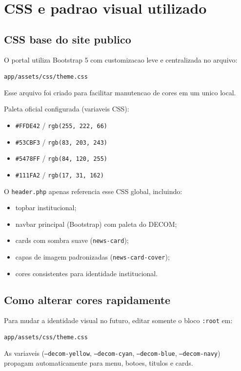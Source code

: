 \documentclass[12pt,a4paper]{article}
\begin{document}
\section{CSS e padrao visual utilizado}
\subsection{CSS base do site publico}
O portal utiliza Bootstrap 5 com customizacao leve e centralizada no arquivo:
\begin{center}
\texttt{app/assets/css/theme.css}
\end{center}
Esse arquivo foi criado para facilitar manutencao de cores em um unico local.

Paleta oficial configurada (variaveis CSS):
\begin{itemize}
    \item \texttt{\#FFDE42} / \texttt{rgb(255, 222, 66)}
    \item \texttt{\#53CBF3} / \texttt{rgb(83, 203, 243)}
    \item \texttt{\#5478FF} / \texttt{rgb(84, 120, 255)}
    \item \texttt{\#111FA2} / \texttt{rgb(17, 31, 162)}
\end{itemize}

O \texttt{header.php} apenas referencia esse CSS global, incluindo:
\begin{itemize}
    \item topbar institucional;
    \item navbar principal (Bootstrap) com paleta do DECOM;
    \item cards com sombra suave (\texttt{news-card});
    \item capas de imagem padronizadas (\texttt{news-card-cover});
    \item cores consistentes para identidade institucional.
\end{itemize}

\subsection{Como alterar cores rapidamente}
Para mudar a identidade visual no futuro, editar somente o bloco \texttt{:root} em:
\begin{center}
\texttt{app/assets/css/theme.css}
\end{center}
As variaveis (\texttt{--decom-yellow}, \texttt{--decom-cyan}, \texttt{--decom-blue}, \texttt{--decom-navy}) propagam automaticamente para menu, botoes, titulos e cards.
\end{document}
